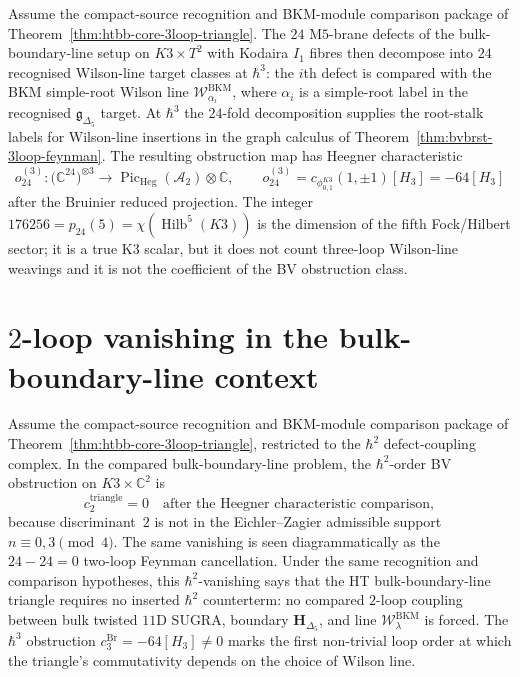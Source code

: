 \begin{remark}
\label{rem:htbb-core-24fold-3loop}
Assume the compact-source recognition and BKM-module comparison package
of Theorem~\ref{thm:htbb-core-3loop-triangle}.  The $24$ M$5$-brane
defects of the bulk-boundary-line setup on $K3\times T^2$ with Kodaira
$I_1$ fibres then decompose into $24$ recognised Wilson-line target
classes at $\hbar^3$: the $i$th defect is compared with the BKM
simple-root Wilson line
$\mathcal{W}^{\mathrm{BKM}}_{\alpha_i}$, where \(\alpha_i\) is a
simple-root label in the recognised \(\mathfrak g_{\Delta_5}\) target.
At $\hbar^3$ the $24$-fold decomposition supplies the root-stalk labels
for Wilson-line insertions in the graph calculus of
Theorem~\ref{thm:bvbrst-3loop-feynman}. The resulting obstruction map
has Heegner characteristic
\[
 o^{(3)}_{24}\colon
 \bigl(\mathbb C^{24}\bigr)^{\otimes 3}
 \longrightarrow
 \operatorname{Pic}_{\mathrm{Heg}}(\mathcal A_2)\otimes\mathbb C,
 \qquad
	 o^{(3)}_{24}=c_{\phi_{0,1}^{K3}}(1,\pm1)[H_3]=-64[H_3]
\]
after the Bruinier reduced projection. The integer
$176256=p_{24}(5)=\chi(\operatorname{Hilb}^5(K3))$ is the dimension of
the fifth Fock/Hilbert sector; it is a true K3 scalar, but it does not
count three-loop Wilson-line weavings and it is not the coefficient of
the BV obstruction class.
\end{remark}

\section{$2$-loop vanishing in the
bulk-boundary-line context}
\label{sec:htbb-core-2loop-vanish}

\begin{remark}
\label{rem:htbb-core-2loop-vanish}

Assume the compact-source recognition and BKM-module comparison package
of Theorem~\ref{thm:htbb-core-3loop-triangle}, restricted to the
$\hbar^2$ defect-coupling complex. In the compared
bulk-boundary-line problem, the $\hbar^2$-order BV obstruction on
$K3\times\mathbb{C}^2$ is
\[
 c^{\mathrm{triangle}}_2
 =0
 \quad\text{after the Heegner characteristic comparison},
\]
because discriminant~$2$ is not in the Eichler--Zagier admissible
support $n\equiv 0,3\pmod 4$. The same vanishing is seen diagrammatically as
the $24-24=0$ two-loop Feynman cancellation. Under the same recognition
and comparison hypotheses, this $\hbar^2$-vanishing says that the HT
bulk-boundary-line triangle requires no inserted $\hbar^2$ counterterm:
no compared $2$-loop coupling between bulk twisted $11$D SUGRA,
boundary $\mathbf{H}_{\Delta_5}$, and line
$\mathcal{W}^{\mathrm{BKM}}_\lambda$ is forced. The
	$\hbar^3$ obstruction \(c^{\mathrm{Br}}_3=-64[H_3]\neq 0\) marks the first non-trivial
loop order at which the triangle's commutativity depends on the
choice of Wilson line.
\end{remark}

